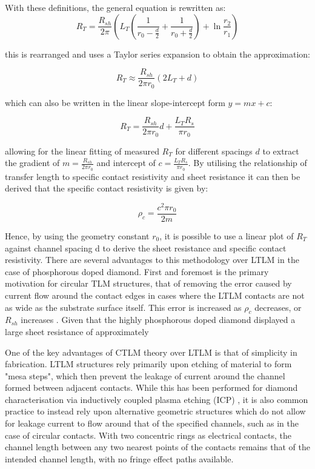 \begin{refsection}
With these definitions, the general equation is rewritten as:
\begin{equation}
    R_{T} = \frac{R_{sh}}{2\pi} \left(L_{T}\left(\frac{1}{r_{0}-\frac{d}{2}}+\frac{1}{r_{0}+\frac{d}{2}}\right)+\ln{\frac{r_{2}}{r_{1}}}\right)
    \label{eq:ctlm_theory_subbed_in}
\end{equation}

this is rearranged and uses a Taylor series expansion to obtain the approximation:

\begin{equation}
    R_{T} \approx \frac{R_{sh}}{2\pi r_{0}}\left(2L_{T}+d\right)
\end{equation}

which can also be written in the linear slope-intercept form $y=mx+c$:

\begin{equation}
    R_{T} = \frac{R_{sh}}{2\pi r_{0}}d + \frac{L_{T}R_{s}}{\pi r_{0}}
\end{equation}

allowing for the linear fitting of measured $R_{T}$ for different spacings $d$ to extract the gradient of $m = \frac{R_{sh}}{2\pi r_{0}}$ and intercept of $c =\frac{L_{T}R_{s}}{\pi r_{0}}$. By utilising the relationship of transfer length to specific contact resistivity and sheet resistance it can then be derived that the specific contact resistivity is given by:

\begin{equation}
    \label{eq:rhoc_definition_linear_fit}
    \rho_{c} = \frac{c^{2}\pi r_{0}}{2m}
\end{equation}

Hence, by using the geometry constant $r_{0}$, it is possible to use a linear plot of $R_{T}$ against channel spacing d to derive the sheet resistance and specific contact resistivity. There are several advantages to this methodology over LTLM in the case of phosphorous doped diamond. First and foremost is the primary motivation for circular TLM structures, that of removing the error caused by current flow around the contact edges in cases where the LTLM contacts are not as wide as the substrate surface itself. This error is increased as $\rho_{c}$ decreases, or $R_{sh}$ increases \cite{Maserjian1982}. Given that the highly phosphorous doped diamond displayed a large sheet resistance of approximately

One of the key advantages of CTLM theory over LTLM is that of simplicity in fabrication. LTLM structures rely primarily upon etching of material to form "mesa steps", which then prevent the leakage of current around the channel formed between adjacent contacts. While this has been performed for diamond characterisation via inductively coupled plasma etching (ICP) \cite{defeudis2019}, it is also common practice to instead rely upon alternative geometric structures which do not allow for leakage current to flow around that of the specified channels, such as in the case of circular contacts. With two concentric rings as electrical contacts, the channel length between any two nearest points of the contacts remains that of the intended channel length, with no fringe effect paths available.


\end{refsection}
